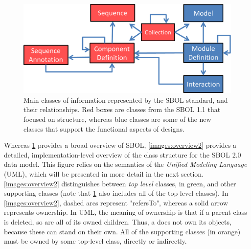 \begin{figure}[ht]
\begin{center}
\includegraphics[scale=0.7]{images/OverviewFigforSpec-v7.png}
\caption{Main classes of information represented by the SBOL standard, and their relationships.  Red boxes are classes from the SBOL 1.1 that focused on structure, whereas blue classes are some of the new classes that support the functional aspects of designs.}
\label{images:overview1}
\end{center}
\end{figure}

Whereas \ref{images:overview1} provides a broad overview of SBOL, \ref{images:overview2} provides a detailed, implementation-level overview of the class structure for the SBOL 2.0 data model. This figure relies on the semantics of the \emph{Unified Modeling Language} (UML), which will be presented in more detail in the next section. \ref{images:overview2} distinguishes between \emph{top level} classes, in green, and other supporting classes (note that \ref{images:overview1} also includes all of the top level classes). In \ref{images:overview2}, dashed arcs represent "refersTo", whereas a solid arrow represents ownership. In UML, the meaning of ownership is that if a parent class is deleted, so are all of its owned children. Thus, a  does not own its
 objects, because these can stand on their own. All of the supporting classes (in orange) must be owned by some top-level class, directly or indirectly. 


